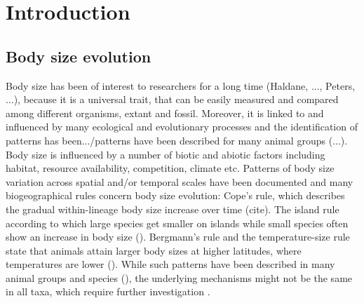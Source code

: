\section{Introduction}
\subsection{Body size evolution}

Body size has been of interest to researchers for a long time (Haldane, ..., Peters, ...), because it is a universal trait, that can be easily measured and compared among different organisms, extant and fossil. Moreover, it is linked to and influenced by many ecological and evolutionary processes and the identification of patterns has been.../patterns have been described for many animal groups (...). Body size is influenced by a number of biotic and abiotic factors including habitat, resource availability, competition, climate etc.
Patterns of body size variation across spatial and/or temporal scales have been documented and many biogeographical rules concern body size evolution: Cope's rule, which describes the gradual within-lineage body size increase over time (cite). The island rule according to which large species get smaller on islands while small species often show an increase in body size (). Bergmann's rule and the temperature-size rule state that animals attain larger body sizes at higher latitudes, where temperatures are lower ().
While such patterns have been described in many animal groups and species (), the underlying mechanisms might not be the same in all taxa, which require further investigation \citep{Smith2009}.



